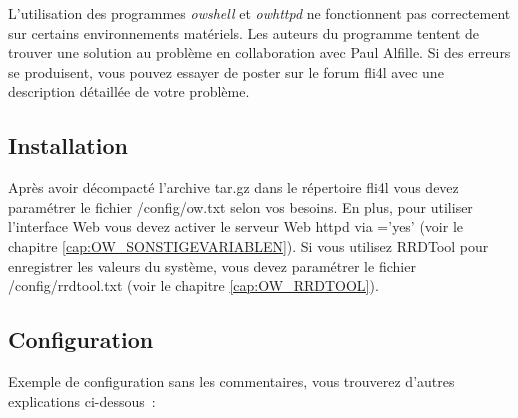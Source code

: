 L'utilisation des programmes \emph{owshell} et \emph{owhttpd} ne fonctionnent pas
correctement sur certains environnements matériels. Les auteurs du programme tentent
de trouver une solution au problème en collaboration avec Paul Alfille. Si des erreurs
se produisent, vous pouvez essayer de poster sur le forum fli4l avec une description
détaillée de votre problème.

\subsection{Installation}
Après avoir décompacté l'archive tar.gz dans le répertoire fli4l vous devez paramétrer
le fichier /config/ow.txt selon vos besoins. En plus, pour utiliser l'interface Web
vous devez activer le serveur Web httpd via ='yes' (voir le chapitre
\ref{cap:OW_SONSTIGEVARIABLEN}). Si vous utilisez RRDTool pour enregistrer les
valeurs du système, vous devez paramétrer le fichier /config/rrdtool.txt
(voir le chapitre \ref{cap:OW_RRDTOOL}).

\subsection{Configuration}
Exemple de configuration sans les commentaires, vous trouverez d'autres explications
ci-dessous~:

